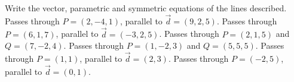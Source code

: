
\begin{Exercise}[
name={},
title={}, 
difficulty=0,
origin={\cite{GHC}}]
Write the vector, parametric and symmetric equations of the lines described.
\Question Passes through $P=(2,-4,1)$, parallel to $\vec d=(9,2,5)$.
\Question Passes through $P=(6,1,7)$, parallel to $\vec d=(-3,2,5)$.
\Question Passes through $P=(2,1,5)$ and $Q = (7,-2,4)$.
\Question Passes through $P=(1,-2,3)$ and $Q = (5,5,5)$.
\Question Passes through $P=(1,1)$, parallel to $\vec d = (2,3)$.
\Question Passes through $P=(-2,5)$, parallel to $\vec d = (0,1)$.
\end{Exercise}
